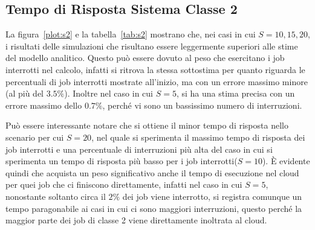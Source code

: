 \subsection{Tempo di Risposta Sistema Classe 2}
La figura~\ref{plot:s2} e la tabella~\ref{tab:s2} mostrano che, nei casi in cui
$S=10,15,20$, i risultati delle simulazioni che risultano essere leggermente
superiori alle stime del modello analitico. Questo può essere dovuto
al peso che esercitano i job interrotti nel calcolo, infatti si ritrova la
stessa sottostima per quanto riguarda le percentuali di job interrotti
mostrate all'inizio, ma con un errore massimo minore (al più del $3.5\%$).
Inoltre nel caso in cui $S=5$, si ha una stima precisa con un errore massimo
dello $0.7\%$, perché vi sono un bassissimo numero di interruzioni.

Può essere interessante notare che si ottiene il minor tempo di risposta nello
scenario per cui $S=20$, nel quale si sperimenta il massimo tempo di risposta
dei job interrotti e una percentuale di interruzioni più alta del caso in cui si
sperimenta un tempo di risposta più basso per i job interrotti($S=10$). È
evidente quindi che acquista un peso significativo anche il tempo di esecuzione
nel cloud per quei job che ci finiscono direttamente, infatti nel caso in cui
$S=5$, nonostante soltanto circa il $2\%$ dei job viene interrotto, si registra
comunque un tempo paragonabile ai casi in cui ci sono maggiori interruzioni,
questo perché la maggior parte dei job di classe 2 viene direttamente inoltrata
al cloud.
